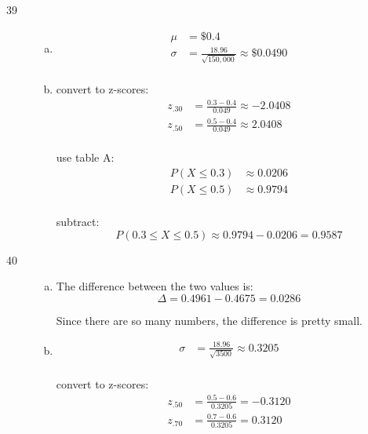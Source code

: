 \documentclass[letterpaper, landscape]{exam}
\begin{document}
\begin{description}
      \item[39]
        \begin{enumerate}[(a)]
          \item 
            \begin{align*}
              \mu    & = \boxed{ \$0.4 } \\
              \sigma & = \frac{18.96}{\sqrt{150,000}} \approx \boxed{ \$0.0490 }\\
            \end{align*}
            
          \item
            convert to z-scores:
            \begin{align*}
              z_{.30} &= \frac{0.3 - 0.4}{0.049} \approx -2.0408 \\ 
              z_{.50} &= \frac{0.5 - 0.4}{0.049} \approx 2.0408 \\
            \end{align*}

            use table A:\@
            \begin{align*}
              P(X \leq 0.3) &\approx 0.0206 \\
              P(X \leq 0.5) &\approx 0.9794 \\
            \end{align*}

            subtract:
            \[
              P(0.3 \leq X \leq 0.5) \approx 0.9794 - 0.0206 = \boxed{ 0.9587 }
            \]

        \end{enumerate}

      \item[40]
        \begin{enumerate}[(a)]
          \item The difference between the two values is:
            \[
              \Delta = 0.4961 - 0.4675 = \boxed{ 0.0286 }
            \]

            Since there are so many numbers, the difference is pretty small.

          \item
            \begin{align*}
              \sigma &= \frac{18.96}{\sqrt{3500}} \approx 0.3205 \\
            \end{align*}
            
            convert to z-scores:
            \begin{align*}
              z_{.50} &= \frac{0.5 - 0.6}{0.3205} = -0.3120 \\
              z_{.70} &= \frac{0.7 - 0.6}{0.3205} = 0.3120 \\
            \end{align*}


\end{enumerate}
\end{description}
\end{document}
